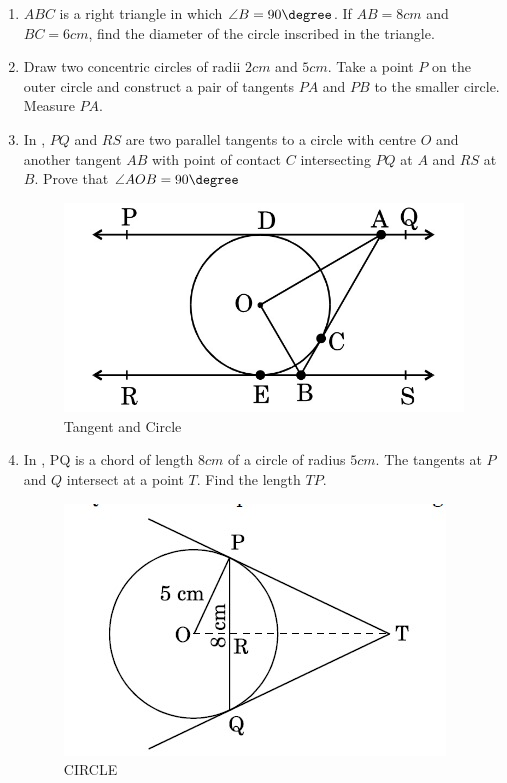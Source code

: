 \begin{enumerate}
\item $ABC$ is a right triangle in which $\angle B = 90\degree$. If $AB = 8 cm$ and $BC = 6 cm$, find the diameter of the circle inscribed in the triangle.

\item Draw two concentric circles of radii $2 cm$ and $5 cm$. Take a point $P$ on the outer circle and construct a pair of tangents $PA$ and $PB$ to the smaller circle. Measure $PA$.  


\item In  , $PQ$ and $RS$ are two parallel tangents to a circle with centre $O$ and another tangent $AB$ with point of contact $C$ intersecting $PQ$ at $A$ and $RS$ at $B$. Prove that $\angle AOB = 90 \degree$
\begin{figure}[H]
    \centering
    \includegraphics[width=\columnwidth]{figs/img3.jpg}
    \caption{Tangent and Circle}
    \label{fig:Figh_3}
\end{figure}

\item In , PQ is a chord of length $8 cm$ of a circle of radius $5 cm$. The tangents at $P$ and $Q$ intersect at a point $T$. Find the length $TP$.
\begin{figure}[H]
    \centering
    \includegraphics[width=\columnwidth]{figs/Screenshot2023-12-27160239.png}
    \caption{CIRCLE}
    \label{fig:Fig-2}
\end{figure}


\end{enumerate}
